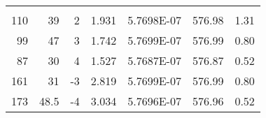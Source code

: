 \documentclass[a4paper,10pt]{article}
\begin{document}
\begin{table}
\begin{tabular}{rrrrrrr}
    \midrule
          &       &       &       &       &       &  \\
    \bottomrule
    \rowcolor[rgb]{ .557,  .663,  .859} \multicolumn{7}{c}{\textcolor[rgb]{ 1,  1,  1}{Giallo interno}} \\
    \toprule
    110   & 39    & 2     & 1.931 & 5.7698E-07 & 576.98 & 1.31 \\
    99    & 47    & 3     & 1.742 & 5.7699E-07 & 576.99 & 0.80 \\
    87    & 30    & 4     & 1.527 & 5.7687E-07 & 576.87 & 0.52 \\
    161   & 31    & -3    & 2.819 & 5.7699E-07 & 576.99 & 0.80 \\
    173   & 48.5  & -4    & 3.034 & 5.7696E-07 & 576.96 & 0.52 \\
    \midrule
    \end{tabular}%
  \label{tab4}%
\end{table}%

	\clearpage
\end{document}

